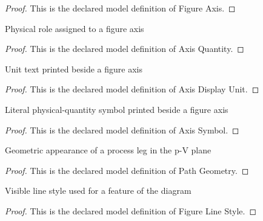 \begin{proof}
  This is the declared model definition of Figure Axis.
\end{proof}
\begin{definition}
  \label{def:physics:phyx-mini-0412:phyxminiproblems-problemphyxmini0412-axisquantity}
  Physical role assigned to a figure axis
\end{definition}
\begin{proof}
  This is the declared model definition of Axis Quantity.
\end{proof}
\begin{definition}
  \label{def:physics:phyx-mini-0412:phyxminiproblems-problemphyxmini0412-axisdisplayunit}
  Unit text printed beside a figure axis
\end{definition}
\begin{proof}
  This is the declared model definition of Axis Display Unit.
\end{proof}
\begin{definition}
  \label{def:physics:phyx-mini-0412:phyxminiproblems-problemphyxmini0412-axissymbol}
  Literal physical-quantity symbol printed beside a figure axis
\end{definition}
\begin{proof}
  This is the declared model definition of Axis Symbol.
\end{proof}
\begin{definition}
  \label{def:physics:phyx-mini-0412:phyxminiproblems-problemphyxmini0412-pathgeometry}
  Geometric appearance of a process leg in the p-V plane
\end{definition}
\begin{proof}
  This is the declared model definition of Path Geometry.
\end{proof}
\begin{definition}
  \label{def:physics:phyx-mini-0412:phyxminiproblems-problemphyxmini0412-figurelinestyle}
  Visible line style used for a feature of the diagram
\end{definition}
\begin{proof}
  This is the declared model definition of Figure Line Style.
\end{proof}
